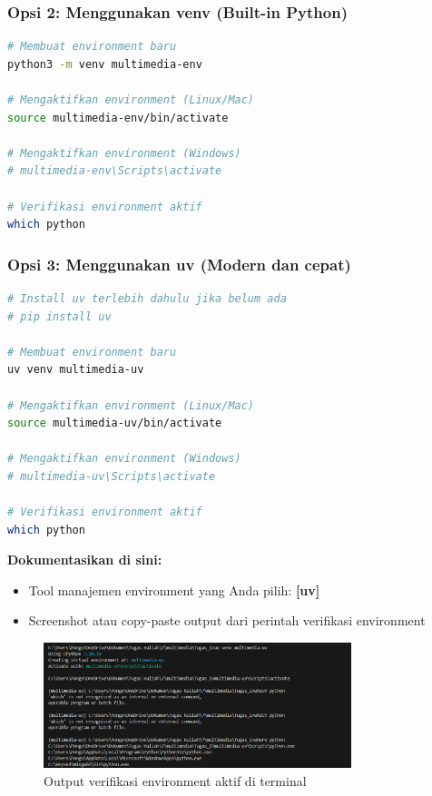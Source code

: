 \documentclass[11pt,a4paper]{article}
\begin{document}
\subsubsection{Opsi 2: Menggunakan venv (Built-in Python)}
\begin{lstlisting}[language=bash, caption=Membuat environment dengan venv]
# Membuat environment baru
python3 -m venv multimedia-env

# Mengaktifkan environment (Linux/Mac)
source multimedia-env/bin/activate

# Mengaktifkan environment (Windows)
# multimedia-env\Scripts\activate

# Verifikasi environment aktif
which python
\end{lstlisting}

\subsubsection{Opsi 3: Menggunakan uv (Modern dan cepat)}
\begin{lstlisting}[language=bash, caption=Membuat environment dengan uv]
# Install uv terlebih dahulu jika belum ada
# pip install uv

# Membuat environment baru
uv venv multimedia-uv

# Mengaktifkan environment (Linux/Mac)
source multimedia-uv/bin/activate

# Mengaktifkan environment (Windows)
# multimedia-uv\Scripts\activate

# Verifikasi environment aktif
which python
\end{lstlisting}

\textbf{Dokumentasikan di sini:}
\begin{itemize}
    \item Tool manajemen environment yang Anda pilih: \textbf{[uv]}
    \item Screenshot atau copy-paste output dari perintah verifikasi environment
\end{itemize}

\begin{figure}[h!]
    \centering
    \includegraphics[width=0.8\textwidth]{Figure/gambar1.png}
    \caption{Output verifikasi environment aktif di terminal}
    \label{fig:output_env}
\end{figure}
\end{document}
